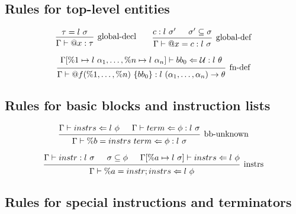 \documentclass{article}
\begin{document}
\subsection{Rules for top-level entities}

\[    
\begin{prooftree}
    \hypo{\tau = l\ \sigma}
    \infer1[global-decl]{\Gamma \vdash @x : \tau}
\end{prooftree}
\qquad
\begin{prooftree}
    \hypo{c : l\ \sigma'}
    \hypo{\sigma' \subseteq \sigma}
    \infer2[global-def]{\Gamma \vdash @x = c : l\ \sigma}
\end{prooftree}
\]

\[
\begin{prooftree}
    \hypo{
    \begin{matrix}
        \Gamma[\%1 \mapsto l\ \alpha_1, \ldots, \%n \mapsto l\ \alpha_n] \vdash bb_0 \Leftarrow \mathcal{U} : l\ \theta \\
    \end{matrix}
    }
    \infer1[fn-def]{\Gamma \vdash @f(\%1, \dots, \%n)\ \{ bb_0 \} : l\ (\alpha_1, \dots, \alpha_n) \rightarrow \theta}
    
\end{prooftree}
\]

\subsection{Rules for basic blocks and instruction lists}

\[
\begin{prooftree} 
    \hypo{\Gamma \vdash instrs \Leftarrow l\ \phi}
    \hypo{\Gamma \vdash term \Leftarrow \phi : l\ \sigma}
    \infer2[bb-unknown]{\Gamma \vdash \%b = instrs\ term \Leftarrow \phi : l\ \sigma}
\end{prooftree} 
\]

\[
\begin{prooftree} 
    \hypo{\Gamma \vdash instr : l\ \sigma}
    \hypo{\sigma \subseteq \phi}
    \hypo{\Gamma[\%a \mapsto l\ \sigma] \vdash instrs \Leftarrow l\ \phi}
    \infer3[instrs]{\Gamma \vdash \%a = instr; instrs \Leftarrow l\ \phi}
\end{prooftree} 
\]

\subsection{Rules for special instructions and terminators}
\end{document}
